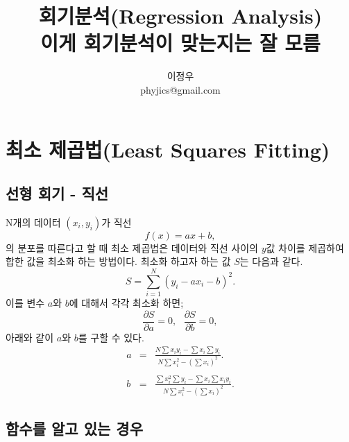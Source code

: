 \documentclass[chapter,a4paper,12pt]{oblivoir}
\begin{document}
\title{회기분석(Regression Analysis)\\ 이게 회기분석이 맞는지는 잘 모름}
\author{이정우\\phyjics@gmail.com}
\maketitle
\tableofcontents

\newpage
\chapter{최소 제곱법(Least Squares Fitting)}

\section{선형 회기 - 직선}

N개의 데이터 $(x_i, y_i)$가 직선
\begin{equation}
f(x) = ax + b,
\end{equation}
의 분포를 따른다고 할 때 최소 제곱법은 데이터와 직선 사이의 $y$값 차이를 제곱하여 합한 값을 최소화 하는 방법이다.
최소화 하고자 하는 값 $S$는 다음과 같다.
\begin{equation}
S = \sum_{i=1}^N (y_i - ax_i - b)^2.
\end{equation}
이를 변수 $a$와 $b$에 대해서 각각 최소화 하면;
\begin{equation}
\frac{\partial S}{\partial a} = 0,\,\,\,\, \frac{\partial S}{\partial b} = 0,
\end{equation}
아래와 같이 $a$와 $b$를 구할 수 있다.
\begin{eqnarray}
a &=& \frac{N\sum x_i y_i - \sum x_i \sum y_i}{N\sum x_i^2 - (\sum x_i)^2}.\\\nonumber\\
b &=& \frac{\sum x_i^2 \sum y_i - \sum x_i \sum x_i y_i}{N\sum x_i^2 - (\sum x_i)^2}.
\end{eqnarray}


\newpage
\section{함수를 알고 있는 경우}
\end{document}
